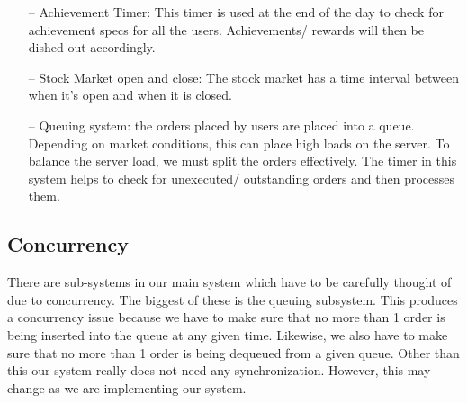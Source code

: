 \begin{itemize}
\item[--]{Achievement Timer: This timer is used at the end of the day to check
for achievement specs for all the users.  Achievements/ rewards will then be
    dished out accordingly.}

\item[--]{Stock Market open and close: The stock market has a time interval
between when it’s open and when it is closed.}

\item[--]{Queuing system: the orders placed by users are placed into a queue.
Depending on market conditions, this can place high loads on the server.
To balance the server load, we must split the orders effectively.  The timer
in this system helps to check for unexecuted/ outstanding orders and then processes
them.}

\end{itemize}

\subsection{Concurrency}
There are sub-systems in our main system which have to be carefully thought of
due to concurrency.  The biggest of these is the queuing subsystem.  This produces
a concurrency issue because we have to make sure that no more than 1 order is being
inserted into the queue at any given time.  Likewise, we also have to make sure that
no more than 1 order is being dequeued from a given queue.  Other than this our system
really does not need any synchronization.  However, this may change as we are
implementing our system.

